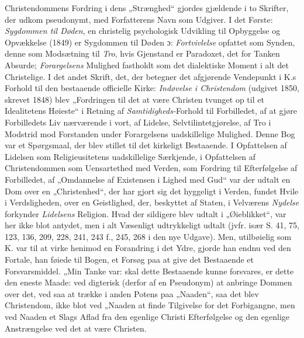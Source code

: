 \documentclass[12pt,a4paper]{book}
\begin{document}
Christendommens Fordring i dens „Strænghed“ gjordes gjældende i to Skrifter, der udkom pseudonymt, med Forfatterens Navn som Udgiver. I det Første: \emph{Sygdommen til Døden}, en christelig psychologisk Udvikling til Opbyggelse og Opvækkelse (1849) er Sygdommen til Døden ɔ: \emph{Fortvivlelse} opfattet som Synden, denne som Modsætning til \emph{Tro}, hvis Gjenstand er Paradoxet, det for Tanken Absurde; \emph{Forargelsens} Mulighed fastholdt som det dialektiske Moment i alt det Christelige. I det andet Skrift, det, der betegner det afgjørende Vendepunkt i K.s Forhold til den bestaaende officielle Kirke: \emph{Indøvelse i Christendom} (udgivet 1850, skrevet 1848) blev „Fordringen til det at være Christen tvunget op til et Idealitetens Høieste“ i Retning af \emph{Samtidigheds-}Forhold til Forbilledet, af at gjøre Forbilledets Liv nærværende i vort, af Lidelse, Selvtilintetgjørelse, af Tro i Modstrid mod Forstanden under Forargelsens uadskillelige Mulighed.
Denne Bog var et Spørgsmaal, der blev stillet til det kirkeligt Bestaaende. I Opfattelsen af Lidelsen som Religieusitetens uadskillelige Særkjende, i Opfattelsen af Christendommen som Uensartethed med Verden, som Fordring til Efterfølgelse af Forbilledet, af „Omdannelse af Existensen i Lighed med Gud“ var der udtalt en Dom over en „Christenhed“, der har gjort sig det hyggeligt i Verden, fundet Hvile i Verdsligheden, over en Geistlighed, der, beskyttet af Staten, i Velværens \emph{Nydelse} forkynder \emph{Lidelsens} Religion. Hvad der sildigere blev udtalt i „Øieblikket“, var her ikke blot antydet, men i alt Væsenligt udtrykkeligt udtalt (jvfr. især S. 41, 75, 123, 136, 209, 228, 241, 243 f., 245, 268 i den nye Udgave).
Men, utilbøielig som K. var til at virke henimod en Forandring i det Ydre, gjorde han endnu ved den Fortale, han føiede til Bogen, et Forsøg paa at give det Bestaaende et Forsvarsmiddel. „Min Tanke var: skal dette Bestaaende kunne forsvares, er dette den eneste Maade: ved digterisk (derfor af en Pseudonym) at anbringe Dommen over det, ved saa at trække i anden Potens paa „Naaden“, saa det blev Christendom, ikke blot ved „Naaden at finde Tilgivelse for det Forbigangne, men ved Naaden et Slags Aflad fra den egenlige Christi Efterfølgelse og den egenlige Anstrængelse ved det at være Christen.
\end{document}
